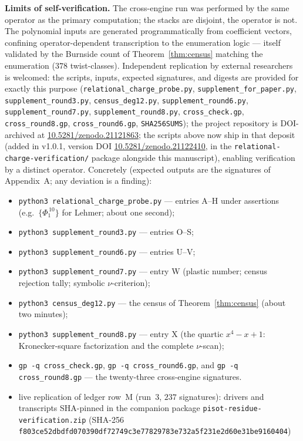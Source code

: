 \documentclass[11pt]{article}
\theoremstyle{plain}
\theoremstyle{definition}
\theoremstyle{remark}
\begin{document}
\textbf{Limits of self-verification.} The cross-engine run was performed by
the same operator as the primary computation; the stacks are disjoint, the
operator is not. The polynomial inputs are generated programmatically from
coefficient vectors, confining operator-dependent transcription to the
enumeration logic --- itself validated by the Burnside count of
Theorem~\ref{thm:census} matching the enumeration ($378$ twist-classes).
Independent replication by external researchers is welcomed:
the scripts, inputs, expected signatures, and digests are provided for
exactly this purpose (\texttt{relational\_charge\_probe.py},
\texttt{supplement\_for\_paper.py}, \texttt{supplement\_round3.py},
\texttt{census\_deg12.py}, \texttt{supplement\_round6.py},
\texttt{supplement\_round7.py}, \texttt{supplement\_round8.py},
\texttt{cross\_check.gp}, \texttt{cross\_round8.gp},
\texttt{cross\_round6.gp}, \texttt{SHA256SUMS}); the project repository is DOI-archived at
\url{10.5281/zenodo.21121863}; the scripts above now ship in that deposit
(added in v1.0.1, version DOI \url{10.5281/zenodo.21122410}, in the
\texttt{relational-charge-verification/} package alongside this
manuscript), enabling verification by a distinct operator. Concretely (expected
outputs are the signatures of Appendix~A; any deviation is a finding):
\begin{itemize}
\item \texttt{python3 relational\_charge\_probe.py} --- entries A--H under
assertions (e.g.\ $\{\Phi_1^{\,10}\}$ for Lehmer; about one second);
\item \texttt{python3 supplement\_round3.py} --- entries O--S;
\item \texttt{python3 supplement\_round6.py} --- entries U--V;
\item \texttt{python3 supplement\_round7.py} --- entry W (plastic number;
census rejection tally; symbolic $\nu$-criterion);
\item \texttt{python3 census\_deg12.py} --- the census of
Theorem~\ref{thm:census} (about two minutes);
\item \texttt{python3 supplement\_round8.py} --- entry X (the quartic
$x^4-x+1$: Kronecker-square factorization and the complete $\nu$-scan);
\item \texttt{gp -q cross\_check.gp}, \texttt{gp -q cross\_round6.gp}, and
\texttt{gp -q cross\_round8.gp}
--- the twenty-three cross-engine signatures.
\item live replication of ledger row~M (run~3, $237$ signatures): drivers
and transcripts SHA-pinned in the companion package
\texttt{pisot-residue-verification.zip} (SHA-256 \texttt{f803ce52dbdfd070}\allowbreak\texttt{390df72749c3e778}\allowbreak\texttt{29783e732a5f231e}\allowbreak\texttt{2d60e31be9160404})
\end{itemize}
\end{document}
